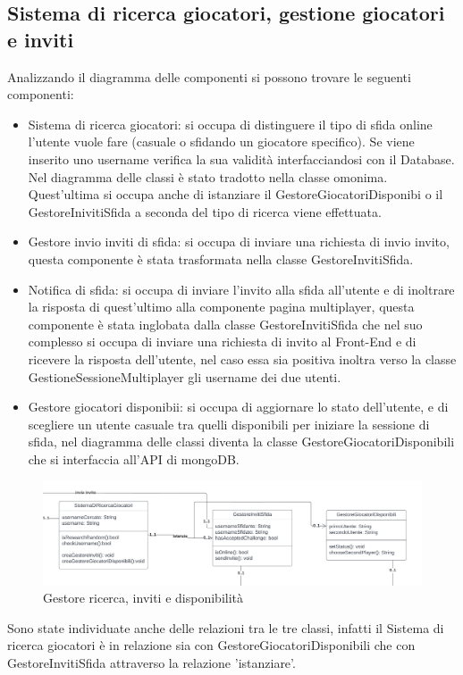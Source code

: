 \subsection{Sistema di ricerca giocatori, gestione giocatori e inviti}
Analizzando il diagramma delle componenti si possono trovare le seguenti componenti:
\begin{itemize}
    \item Sistema di ricerca giocatori: si occupa di distinguere il tipo di sfida online l'utente vuole fare (casuale o sfidando un giocatore specifico). Se viene inserito uno username verifica la sua validità interfacciandosi con il Database. Nel diagramma delle classi è stato tradotto nella classe omonima. Quest'ultima si occupa anche di istanziare il GestoreGiocatoriDisponibi o il GestoreInivitiSfida a seconda del tipo di ricerca viene effettuata.
    \item Gestore invio inviti di sfida: si occupa di inviare una richiesta di invio invito, questa componente è stata trasformata nella classe GestoreInvitiSfida.
    \item Notifica di sfida: si occupa di inviare l'invito alla sfida all'utente e di inoltrare la risposta di quest'ultimo alla componente pagina multiplayer, questa componente è stata inglobata dalla classe GestoreInvitiSfida che nel suo complesso si occupa di inviare una richiesta di invito al Front-End e di ricevere la risposta dell'utente, nel caso essa sia positiva inoltra verso la classe GestioneSessioneMultiplayer gli username dei due utenti.
    \item Gestore giocatori disponibii: si occupa di aggiornare lo stato dell'utente, e di scegliere un utente casuale tra quelli disponibili per iniziare la sessione di sfida, nel diagramma delle classi diventa la classe GestoreGiocatoriDisponibili che si interfaccia all'API di mongoDB. \\
\end{itemize}

\begin{figure}[!h]
\centering
\includegraphics[scale=0.10]{images/classe_ricerca_invita_disponibilita_giocatori.png}
\caption{Gestore ricerca, inviti e disponibilità}
\label{fig:classe_ricerca_inviti_disponibilità}
\end{figure}
\noindent
Sono state individuate anche delle relazioni tra le tre classi, infatti il Sistema di ricerca giocatori è in relazione sia con GestoreGiocatoriDisponibili che con GestoreInvitiSfida attraverso la relazione 'istanziare'.

